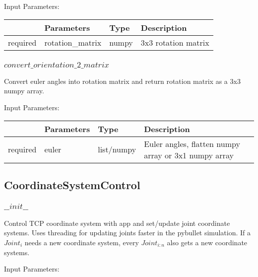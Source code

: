 \documentclass[
	ngerman,
	accentcolor=9c,%
	type=intern,
	marginpar=false
	]{tudapub}
\begin{document}
\vspace{0.5cm}
\noindent Input Parameters:
\vspace{0.5cm}

\begin{tabular}{|p{}|p{}|p{}| p{}|}
\hline
 & \textbf{Parameters} & \textbf{Type} & \textbf{Description} \\
\hline
required & rotation\_matrix & numpy & 3x3 rotation matrix \\
\hline
\end{tabular}
\vspace{1cm}

\subsubsection{$convert\_orientation\_2\_matrix$}
\noindent Convert euler angles into rotation matrix and return rotation matrix as a 3x3 numpy array.

\vspace{0.5cm}
\noindent Input Parameters:
\vspace{0.5cm}

\begin{tabular}{|p{}|p{}|p{}| p{}|}
\hline
 & \textbf{Parameters} & \textbf{Type} & \textbf{Description} \\
\hline
required & euler & list/numpy & Euler angles, flatten numpy array or 3x1 numpy array \\
\hline
\end{tabular}
\vspace{1cm}


\subsection{CoordinateSystemControl}

\subsubsection{$\_\_init\_\_$}
\noindent Control TCP coordinate system with app and set/update joint coordinate systems. Uses threading for updating joints faster in the pybullet simulation. If a $Joint_i$ needs a new coordinate system, every $Joint_{i:n}$ also gets a new coordinate systems.

\vspace{0.5cm}
\noindent Input Parameters:
\vspace{0.5cm}
\end{document}
